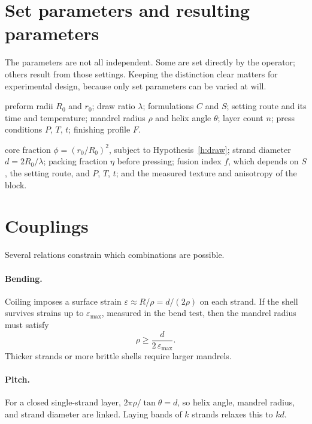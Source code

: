 \documentclass[11pt,openany]{book}
\theoremstyle{definition}
\begin{document}
\section{Set parameters and resulting parameters}

The parameters are not all independent. Some are set directly by the operator; others result from those settings. Keeping the distinction clear matters for experimental design, because only set parameters can be varied at will.

\begin{description}[leftmargin=1.5em]
\item[Set directly:] preform radii $R_0$ and $r_0$; draw ratio $\lambda$; formulations $C$ and $S$; setting route and its time and temperature; mandrel radius $\rho$ and helix angle $\theta$; layer count $n$; press conditions $P$, $T$, $t$; finishing profile $F$.
\item[Resulting:] core fraction $\phi = (r_0/R_0)^2$, subject to Hypothesis~\ref{h:draw}; strand diameter $d = 2R_0/\lambda$; packing fraction $\eta$ before pressing; fusion index $f$, which depends on $S$, the setting route, and $P$, $T$, $t$; and the measured texture and anisotropy of the block.
\end{description}

\section{Couplings}

Several relations constrain which combinations are possible.

\paragraph{Bending.} Coiling imposes a surface strain $\varepsilon \approx R/\rho = d/(2\rho)$ on each strand. If the shell survives strains up to $\varepsilon_{\max}$, measured in the bend test, then the mandrel radius must satisfy
\[
\rho \geq \frac{d}{2\,\varepsilon_{\max}} .
\]
Thicker strands or more brittle shells require larger mandrels.

\paragraph{Pitch.} For a closed single-strand layer, $2\pi\rho/\tan\theta = d$, so helix angle, mandrel radius, and strand diameter are linked. Laying bands of $k$ strands relaxes this to $kd$.
\end{document}
